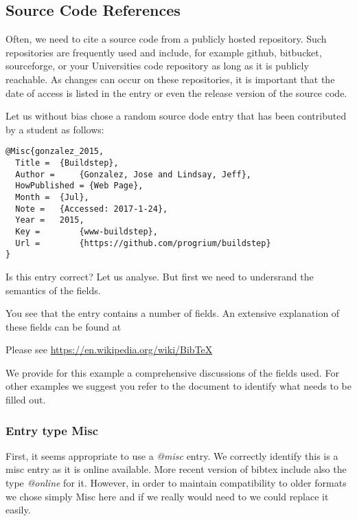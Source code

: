 \subsection{Source Code References}
\label{s:e:source-code-references}

Often, we need to cite a source code from a publicly hosted
repository. Such repositories are frequently used and include, for
example github, bitbucket, sourceforge, or your Universities code
repository as long as it is publicly reachable. As changes can occur on
these repositories, it is important that the date of access is listed in
the entry or even the release version of the source code.

Let us without bias chose a random source dode entry that has been
contributed by a student as follows:

\begin{verbatim}
@Misc{gonzalez_2015,
  Title =  {Buildstep},
  Author =     {Gonzalez, Jose and Lindsay, Jeff},
  HowPublished = {Web Page},
  Month =  {Jul},
  Note =   {Accessed: 2017-1-24},
  Year =   2015,
  Key =        {www-buildstep},
  Url =        {https://github.com/progrium/buildstep}
}
\end{verbatim}

Is this entry correct? Let us analyse. But first we need to undersrand
the semantics of the fields.


You see that the entry contains a number of fields. An extensive
explanation of these fields can be found at 

Please see \url{https://en.wikipedia.org/wiki/BibTeX}

We provide for this example a comprehensive discussions of the fields
used. For other examples we suggest you refer to the document to
identify what needs to be filled out.

\subsubsection{Entry type Misc}\label{s:e:entry-type-misc}

First, it seems appropriate to use a \emph{@misc} entry. We correctly
identify this is a misc entry as it is online available. More recent
version of bibtex include also the type \emph{@online} for it. However,
in order to maintain compatibility to older formats we chose simply Misc
here and if we really would need to we could replace it easily.


